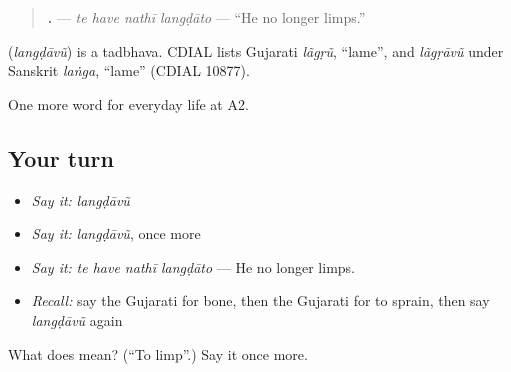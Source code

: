 \begin{quote}
\textbf{   .} — \emph{te have nathī langḍāto} — \textquotedblleft{}He no longer limps.\textquotedblright{}
\end{quote}

\begin{cousinweb}
\textbf{} (\emph{langḍāvũ}) is a tadbhava. CDIAL lists Gujarati \emph{lãgṛũ}, \textquotedblleft{}lame\textquotedblright{}, and \emph{lãgṛāvũ} under Sanskrit \emph{laṅga}, \textquotedblleft{}lame\textquotedblright{} (CDIAL 10877).
\end{cousinweb}

\begin{grammarlens}[title={What you've built}]
One more word for everyday life at A2.
\end{grammarlens}

\subsection*{Your turn}
\begin{itemize}
\raggedright
  \item \emph{Say it:} \emph{langḍāvũ}
  \item \emph{Say it:} \emph{langḍāvũ}, once more
  \item \emph{Say it:} \emph{te have nathī langḍāto} — He no longer limps.
  \item \emph{Recall:} say the Gujarati for bone, then the Gujarati for to sprain, then say \emph{langḍāvũ} again
\end{itemize}

\begin{tcolorbox}[breakable,colback=teal!4,colframe=teal!35!black,title={Before you move on}]
What does  mean? (\textquotedblleft{}To limp\textquotedblright{}.) Say it once more.
\end{tcolorbox}
